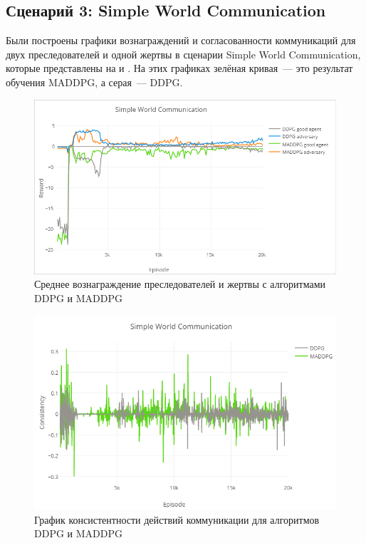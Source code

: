\subsection{Сценарий 3: Simple World Communication} \label{exp-results-svc}

Были построены графики вознаграждений и согласованности коммуникаций для двух преследователей и одной жертвы в сценарии Simple World Communication, которые представлены на  и . На этих графиках зелёная кривая~--- это результат обучения MADDPG, а серая~--- DDPG.

\begin{figure}[ht!]
    \center
    \includegraphics [scale=0.6] {my_folder/images/ch5/swc-rew.png}
    \caption{Среднее вознаграждение преследователей и жертвы с алгоритмами DDPG и MADDPG}
    \label{fig:result-swc-rew}
\end{figure}

\begin{figure}[ht!]
    \center
    \includegraphics [scale=0.6] {my_folder/images/ch5/swc-comm.png}
    \caption{График консистентности действий коммуникации для алгоритмов DDPG и MADDPG}
    \label{fig:result-swc-comm}
\end{figure}


